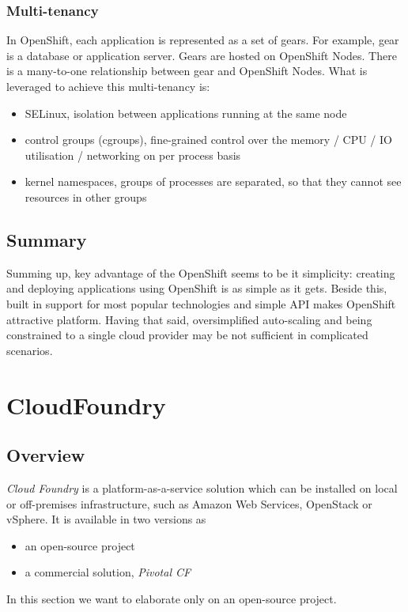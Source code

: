 \subsubsection{Multi-tenancy}
In OpenShift, each application is represented as a set of gears. For example, gear is a database or application server. Gears are hosted on OpenShift Nodes. There is a many-to-one relationship between gear and OpenShift Nodes. What is leveraged to achieve this multi-tenancy is:
\begin{itemize}
 \item SELinux, isolation between applications running at the same node
 \item control groups (cgroups), fine-grained control over the memory / CPU / IO utilisation / networking on per process basis
 \item kernel namespaces, groups of processes are separated, so that they cannot see resources in other groups
\end{itemize}

\subsection{Summary}
Summing up, key advantage of the OpenShift seems to be it simplicity: creating and deploying applications using OpenShift is as simple as it gets. Beside this, built in support for most popular technologies and simple API makes OpenShift attractive platform. Having that said, oversimplified auto-scaling and being constrained to a single cloud provider may be not sufficient in complicated scenarios.

\section{CloudFoundry}
\subsection{Overview}
\emph{Cloud Foundry} is a platform-as-a-service solution which can be installed on local or off-premises infrastructure, such as Amazon Web Services, OpenStack or vSphere. It is available in two versions as
\begin{itemize}
  \item an open-source project
  \item a commercial solution, \emph{Pivotal CF}
\end{itemize}
In this section we want to elaborate only on an open-source project.

